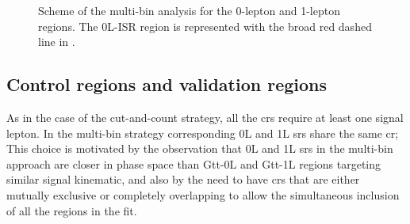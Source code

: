 \begin{figure}[h]
	\caption{Scheme of the multi-bin analysis for the  0-lepton 
	and  1-lepton regions. 
        The 0L-ISR region is represented with the broad red 
	dashed line in . 
      }
	\label{fig:multibin_scheme}
\end{figure}

\subsection*{Control regions and validation regions}

As in the case of the cut-and-count strategy, all the \glspl{cr} require at least one signal lepton. 
In the multi-bin strategy corresponding 0L and 1L \glspl{sr} share the same \gls{cr};
This choice is motivated by the observation that 0L and 1L \glspl{sr} in the multi-bin approach are 
closer in phase space than Gtt-0L and Gtt-1L regions targeting similar signal kinematic, 
and also by the need to have \glspl{cr} that are either mutually exclusive or completely overlapping to 
allow the simultaneous inclusion of all the regions in the fit. 




\clearpage

